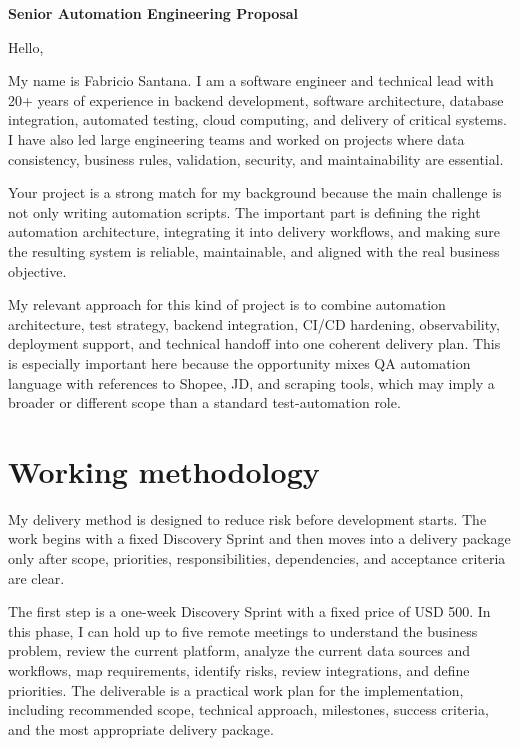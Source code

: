 \documentclass[11pt,a4paper]{article}
\begin{document}
\begin{center}
{\LARGE\bfseries Senior Automation Engineering Proposal}
\end{center}
\vspace{0.5em}

Hello,\par

My name is Fabricio Santana. I am a software engineer and technical lead with 20+ years of experience in backend development, software architecture, database integration, automated testing, cloud computing, and delivery of critical systems. I have also led large engineering teams and worked on projects where data consistency, business rules, validation, security, and maintainability are essential.\par

Your project is a strong match for my background because the main challenge is not only writing automation scripts. The important part is defining the right automation architecture, integrating it into delivery workflows, and making sure the resulting system is reliable, maintainable, and aligned with the real business objective.\par

My relevant approach for this kind of project is to combine automation architecture, test strategy, backend integration, CI/CD hardening, observability, deployment support, and technical handoff into one coherent delivery plan. This is especially important here because the opportunity mixes QA automation language with references to Shopee, JD, and scraping tools, which may imply a broader or different scope than a standard test-automation role.\par

\section*{Working methodology}

My delivery method is designed to reduce risk before development starts. The work begins with a fixed Discovery Sprint and then moves into a delivery package only after scope, priorities, responsibilities, dependencies, and acceptance criteria are clear.\par

The first step is a one-week Discovery Sprint with a fixed price of USD 500. In this phase, I can hold up to five remote meetings to understand the business problem, review the current platform, analyze the current data sources and workflows, map requirements, identify risks, review integrations, and define priorities. The deliverable is a practical work plan for the implementation, including recommended scope, technical approach, milestones, success criteria, and the most appropriate delivery package.\par
\end{document}
